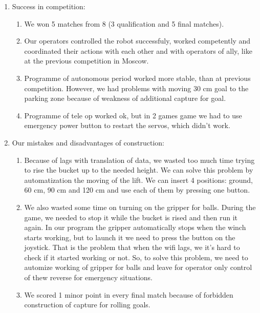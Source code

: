 \begin{enumerate}
	\item Success in competition:
	\begin{enumerate}
		
		\item We won 5 matches from 8 (3 qualification and 5 final matches).
		
		\item Our operators controlled the robot successfuly, worked competently and coordinated their actions with each other and with operators of ally, like at the previous competition in Moscow.

		\item Programme of autonomous period worked more stable, than at previous competition. However, we had problems with moving 30 cm goal to the parking zone because of weakness of additional capture for goal.
		
		\item Programme of tele op worked ok, but in 2 games game we had to use emergency power button to restart the servos, which didn't work.
		
	\end{enumerate}
	
	\item Our mistakes and disadvantages of construction:
	\begin{enumerate}
		\item Because of lags with translation of data, we wasted too much time trying to rise the bucket up to the needed height. We can solve this problem by automatization the moving of the lift. We can insert 4 positions: ground, 60 cm, 90 cm and 120 cm and use each of them by pressing one button.
		
		\item We also wasted some time on turning on the gripper for balls. During the game, we needed to stop it while the bucket is rised and then run it again. In our program the gripper automatically stops when the winch starts working, but to launch it we need to press the button on the joystick. That is the problem that when the wifi lags, we it's hard to check if it started working or not. So, to solve this problem, we need to automize working of gripper for balls and leave for operator only control of thew reverse for emergency situations.
		
		\item We scored 1 minor point in every final match because of forbidden construction of capture for rolling goals.
		

\end{enumerate}
\end{enumerate}
